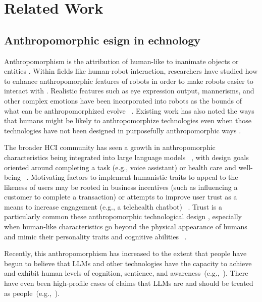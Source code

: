 \section{Related Work}
\subsection{Anthropomorphic esign in echnology}
Anthropomorphism is the attribution of human-like  to inanimate objects or entities \cite{disalvo2004kinds}. Within fields like human-robot interaction, researchers have studied how to enhance anthropomorphic features of robots in order to make robots easier to interact with \cite{fink2012anthropomorphism, riek2009how, lee2006can}. Realistic features such as eye expression output, mannerisms, and other complex emotions have been incorporated into robots as the bounds of what can be anthropomorphized evolve ~\cite{cohn2024believing, mishra2023real, liu2023robots}. Existing work has also noted the ways that humans might be likely to anthropomorphize technologies even when those technologies have not been designed in purposefully anthropomorphic ways \cite{nass1994computers}.

The broader HCI community has seen a growth in anthropomorphic characteristics being integrated into large language models ~\cite{cohn2024believing, cheng2024anthroscore}, with design goals oriented around completing a task (e.g., voice assistant) or health care and well-being ~\cite{seymour2021exploring, sin2019preliminary}. Motivating factors to implement humanistic traits to appeal to the likeness of users may be rooted in business incentives (such as influencing a customer to complete a transaction) or attempts to improve user trust as a means to increase engagement (e.g., a telehealth chatbot) ~\cite{schanke2021estimating, kim2024anthropomorphism}. Trust is a particularly common  these anthropomorphic technological design , especially when human-like characteristics go beyond the physical appearance of humans and mimic their personality traits and cognitive abilities ~\cite{lee2006can, harrington2023trust}. 

Recently, this anthropomorphism has increased to the extent that people have begun to believe that LLMs and other technologies have the capacity to achieve and exhibit human levels of cognition, sentience, and awareness~(e.g.,~\cite{stephen2024sentient, orf2024stunning, chalmers2023could}). There have even been high-profile cases of claims that LLMs are and should be treated as people~(e.g.,~\cite{Tiku2022google}). 

